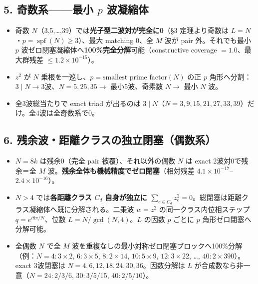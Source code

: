\documentclass[
  a4paper,
]{ltjsarticle}
\providecommand{\tightlist}{%
  \setlength{\itemsep}{0pt}\setlength{\parskip}{0pt}}
\begin{document}
\subsection{\texorpdfstring{5. 奇数系------最小 \(p\)
波凝縮体}{5. 奇数系------最小 p 波凝縮体}}\label{ux5947ux6570ux7cfbux6700ux5c0f-p-ux6ce2ux51ddux7e2eux4f53}

\begin{itemize}
\tightlist
\item
  奇数 \(N\)（3,5,\ldots,39）では\textbf{光子型二波対が完全に0}（§3
  定理より奇数は \(L=N\)・\(p=\operatorname{spf}(N)\ge3\)）、最大
  matching 0、全 \(M\) 波が pair 外。それでも最小 \(p\)
  波ゼロ閉塞凝縮体へ\textbf{100\%完全分解}可能（constructive coverage
  \(=1.0\)、最大群残差 \(\le1.2\times10^{-15}\)）。
\item
  \(z^2\) が \(N\) 乗根を一巡し、\(p=\text{smallest prime factor}(N)\)
  の正 \(p\) 角形へ分割：\(3\mid N\to3\)波、\(N=5,25,35\to\)
  最小5波、奇素数 \(N\to\) 最小 \(N\) 波。
\item
  全3波総当たりで exact triad が出るのは
  \(3\mid N\)（\(N=3,9,15,21,27,33,39\)）だけ。全4波は全奇数系で0。
\end{itemize}

\subsection{6.
残余波・距離クラスの独立閉塞（偶数系）}\label{ux6b8bux4f59ux6ce2ux8dddux96e2ux30afux30e9ux30b9ux306eux72ecux7acbux9589ux585eux5076ux6570ux7cfb}

\begin{itemize}
\tightlist
\item
  \(N=8k\) は残余0（完全 pair 被覆）、それ以外の偶数 \(N\) は exact
  2波対0で残余＝全 \(M\)
  波。\textbf{残余全体も機械精度でゼロ閉塞}（相対残差
  \(4.1\times10^{-17}\)--\(2.4\times10^{-16}\)）。
\item
  \(N>4\) では\textbf{各距離クラス \(C_d\) 自身が独立に
  \(\sum_{e\in C_d}z_e^2=0\)}。総閉塞は距離クラス凝縮体へ既に分解される。二乗波
  \(w=z^2\) の同一クラス内位相ステップ \(q=e^{i8\pi/N}\)、位数
  \(L=N/\gcd(N,4)\)。\(L\) の因数 \(p\) ごとに \(p\)
  角形ゼロ閉塞へ分解可能。
\item
  全偶数 \(N\) で全 \(M\)
  波を重複なしの最小対称ゼロ閉塞ブロックへ100\%分解（例：\(N=4{:}3\times2\),
  \(6{:}3\times5\), \(8{:}2\times14\), \(10{:}5\times9\),
  \(12{:}3\times22\), \ldots, \(40{:}2\times390\)）。exact 3波閉塞は
  \(N=4,6,12,18,24,30,36\)。因数分解は \(L\)
  が合成数なら非一意（\(N=24{:}2/3/6\), \(30{:}3/5/15\),
  \(40{:}2/5/10\)）。
\end{itemize}
\end{document}

